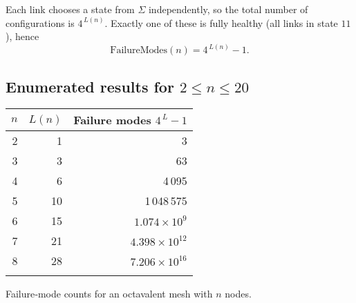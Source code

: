\documentclass[../../../OAE-SPEC-MAIN.tex]{subfiles}
\begin{document}

Each link chooses a state from \(\Sigma\) independently, so the total
number of configurations is \(4^{\,L(n)}\).
Exactly one of these is fully healthy (all links in state \(11\)), hence
\[
\text{FailureModes}(n)=4^{\,L(n)}-1.
\]

\subsection{Enumerated results for \(2\le n\le20\)}

\begin{margintable}
\centering
\begin{tabular}{@{}rrr@{}}
\toprule
\(n\) & \(L(n)\) & Failure modes \(4^{\,L}-1\)\\
\midrule
 2 &  1 & 3\\
 3 &  3 & 63\\
 4 &  6 & 4\,095\\
 5 & 10 & 1\,048\,575\\
 6 & 15 & \(1.074\times10^{9}\)\\
 7 & 21 & \(4.398\times10^{12}\)\\
 8 & 28 & \(7.206\times10^{16}\)\\
\bottomrule
\vspace{8pt}
\end{tabular}
\caption{Failure‑mode counts for an octavalent mesh with \(n\) nodes.}
\vspace{12pt}
\end{margintable}
\end{document}
